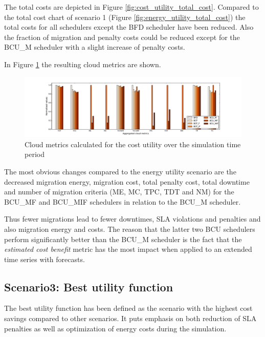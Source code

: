 The total costs are depicted in Figure \ref{fig:cost_utility_total_cost}. Compared to the total cost chart of scenario 1 (Figure \ref{fig:energy_utility_total_cost}) the total costs for all schedulers except the BFD scheduler have been reduced. Also the fraction of migration and penalty costs could be reduced except for the BCU\_M scheduler with a slight increase of penalty costs. 

In Figure \ref{fig:cost_utility_cloud_metrics} the resulting cloud metrics are shown. 

\begin{figure}[htbp]
	\centering
	\hspace*{-1.2in}
		\includegraphics[width=1.50\textwidth]{figures/evaluation_and_results/cost_utility_cloud_metrics.pdf}
	\caption{Cloud metrics calculated for the cost utility over the simulation time period}
	\label{fig:cost_utility_cloud_metrics}
\end{figure}

The most obvious changes compared to the energy utility scenario are the decreased migration energy, migration cost, total penalty cost, total downtime and number of migration criteria (ME, MC, TPC, TDT and NM) for the BCU\_MF and BCU\_MIF schedulers in relation to the BCU\_M scheduler. 

Thus fewer migrations lead to fewer downtimes, SLA violations and penalties and also migration energy and costs. The reason that the latter two BCU schedulers perform significantly better than the BCU\_M scheduler is the fact that the \textit{estimated cost benefit} metric has the most impact when applied to an extended time series with forecasts. 



\subsection{Scenario3: Best utility function} \label{ssec:best_utility_function}

The best utility function has been defined as the scenario with the highest cost savings compared to other scenarios. It puts emphasis on both reduction of SLA penalties as well as optimization of energy costs during the simulation. 

